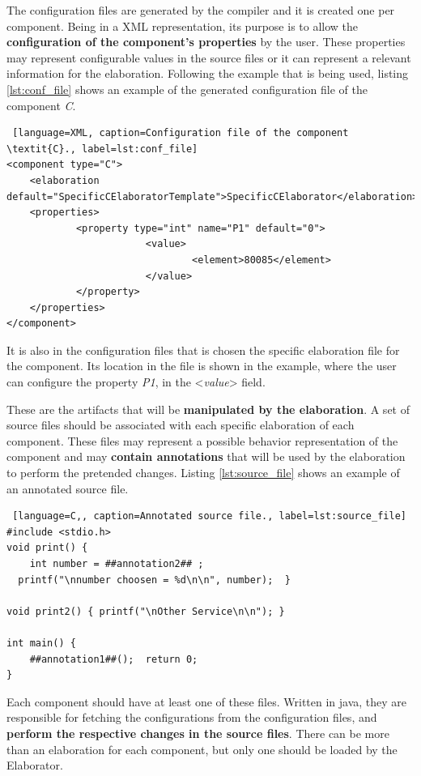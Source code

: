 \documentclass[12pt]{article}
\newcounter{subsubsubsection}[subsubsection]
\begin{document}
{

The configuration files are generated by the compiler and it is created one per component. Being in a XML representation, its purpose is to allow the \textbf{configuration of the component's properties} by the user. These properties may represent configurable values in the source files or it can represent a relevant information for the elaboration. Following the example that is being used, listing \ref{lst:conf_file} shows an example of the generated configuration file of the component \textit{C}.

\begin{lstlisting} [language=XML, caption=Configuration file of the component \textit{C}., label=lst:conf_file]
<component type="C">
	<elaboration default="SpecificCElaboratorTemplate">SpecificCElaborator</elaboration>
	<properties>
			<property type="int" name="P1" default="0">
						<value>
								<element>80085</element>
						</value>
			</property>
	</properties>
</component>
\end{lstlisting}

It is also in the configuration files that is chosen the specific elaboration file for the component. Its location in the file is shown in the example, where the user can configure the property \textit{P1}, in the <\textit{value}> field.


These are the artifacts that will be \textbf{manipulated by the elaboration}. A set of source files should be associated with each specific elaboration of each component. These files may represent a possible behavior representation of the component and may \textbf{contain annotations} that will be used by the elaboration to perform the pretended changes. Listing \ref{lst:source_file} shows an example of an annotated source file.

\begin{lstlisting} [language=C,, caption=Annotated source file., label=lst:source_file]
#include <stdio.h>
void print() {
	int number = ##annotation2## ;
  printf("\nnumber choosen = %d\n\n", number);  }
    
void print2() { printf("\nOther Service\n\n"); }

int main() {
	##annotation1##();  return 0;
}
\end{lstlisting}


Each component should have at least one of these files. Written in java, they are responsible for fetching the configurations from the configuration files, and \textbf{perform the respective changes in the source files}. There can be more than an elaboration for each component, but only one should be loaded by the Elaborator. 

}
\end{document}
